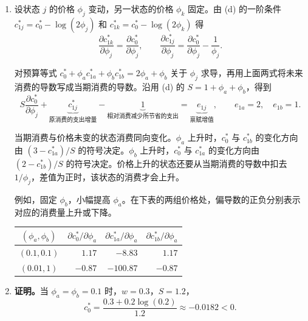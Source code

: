 \begin{solution}[blank-type=manual,blank-vsep=9\baselineskip]
\begin{enumerate}[label=(\alph*)]
    从而 $c_{0}^{*}=-\log\lambda$，且 $c_{1a}^{*}=-\log\lambda-\log(2\phi_{a})$、$c_{1b}^{*}=-\log\lambda-\log(2\phi_{b})$。代入 $w=2\phi_{a}+\phi_{b}$ 得到
    \[
        \begin{aligned}
            c_{0}^{*}&=\frac{2\phi_{a}+\phi_{b}+\phi_{a}\log(2\phi_{a})+\phi_{b}\log(2\phi_{b})}{1+\phi_{a}+\phi_{b}}\\
            c_{1a}^{*}&=\frac{2\phi_{a}+\phi_{b}+\phi_{b}\log(2\phi_{b})-\log(2\phi_{a})-\phi_{b}\log(2\phi_{a})}{1+\phi_{a}+\phi_{b}}\\
            c_{1b}^{*}&=\frac{2\phi_{a}+\phi_{b}+\phi_{a}\log(2\phi_{a})-\log(2\phi_{b})-\phi_{a}\log(2\phi_{b})}{1+\phi_{a}+\phi_{b}}
        \end{aligned}
    \]

    该计划满足预算等式与一阶条件。效用函数严格凹，预算等式给出的可行集是凸集，故这是唯一的全局最优解。
    \item 设状态 $j$ 的价格 $\phi_j$ 变动，另一状态的价格 $\phi_k$ 固定。由 (d) 的一阶条件 $c_{1j}^{*}=c_0^{*}-\log(2\phi_j)$ 和 $c_{1k}^{*}=c_0^{*}-\log(2\phi_k)$ 得
    \[
        \frac{\partial c_{1k}^{*}}{\partial\phi_j}
        =\frac{\partial c_0^{*}}{\partial\phi_j},
        \qquad
        \frac{\partial c_{1j}^{*}}{\partial\phi_j}
        =\frac{\partial c_0^{*}}{\partial\phi_j}-\frac{1}{\phi_j}.
    \]

    对预算等式 $c_0^*+\phi_a c_{1a}^*+\phi_b c_{1b}^*=2\phi_a+\phi_b$ 关于 $\phi_j$ 求导，再用上面两式将未来消费的导数写成当期消费的导数。沿用 (d) 的 $S=1+\phi_a+\phi_b$，得到
    \[
        S\frac{\partial c_0^*}{\partial\phi_j}
        +\underbrace{c_{1j}^*}_{\text{原消费的支出增量}}
        -\underbrace{1}_{\text{相对消费减少所节省的支出}}
        =\underbrace{e_{1j}}_{\text{禀赋增值}},
        \qquad e_{1a}=2,\quad e_{1b}=1.
    \]

    当期消费与价格未变的状态消费同向变化。$\phi_a$ 上升时，$c_0^*$ 与 $c_{1b}^*$ 的变化方向由 $(3-c_{1a}^*)/S$ 的符号决定。$\phi_b$ 上升时，$c_0^*$ 与 $c_{1a}^*$ 的变化方向由 $(2-c_{1b}^*)/S$ 的符号决定。价格上升的状态还要从当期消费的导数中扣去 $1/\phi_j$，差值为正时，该状态的消费才会上升。

    例如，固定 $\phi_b$，小幅提高 $\phi_a$。在下表的两组价格处，偏导数的正负分别表示对应的消费量上升或下降。
    \begin{center}
        \begin{tabular}{@{}crrr@{}}
            $(\phi_a,\phi_b)$ &
            $\partial c_0^*/\partial\phi_a$ &
            $\partial c_{1a}^*/\partial\phi_a$ &
            $\partial c_{1b}^*/\partial\phi_a$ \\
            \hline
            $(0.1,0.1)$ & $1.17$ & $-8.83$ & $1.17$ \\
            $(0.01,1)$  & $-0.87$ & $-100.87$ & $-0.87$
        \end{tabular}
    \end{center}
    \item \textbf{证明。}当 $\phi_{a}=\phi_{b}=0.1$ 时，$w=0.3$，$S=1.2$，
    \[
        c_{0}^{*}=\frac{0.3+0.2\log(0.2)}{1.2}\approx -0.0182<0.
    \]


\end{enumerate}
\end{solution}
